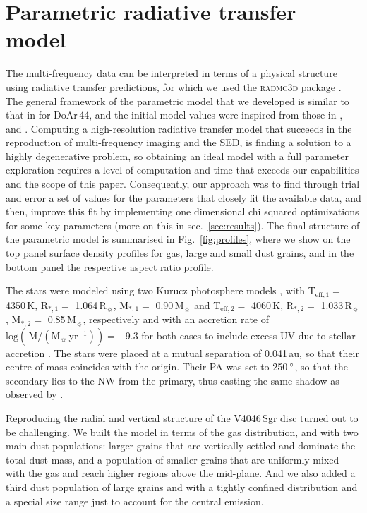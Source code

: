 \documentclass[fleqn,usenatbib,useAMS]{mnras}
\begin{document}
\section{Parametric radiative transfer model} \label{sec:model}

The multi-frequency data can be interpreted in terms of a physical structure using radiative transfer predictions, for which we used the \textsc{radmc3d} package \citep[version 2.0,][]{Dullemond_2012}. The general framework of the parametric model that we developed is similar to that in \citet{2018MNRAS.477.5104C} for DoAr\,44, and the initial model values were inspired from those in \citet{Rosenfeld_2013}, \citet{Ru_z_Rodr_guez_2019} and \citet{2019ApJ...882..160Q}. Computing a high-resolution radiative transfer model that succeeds in the reproduction of multi-frequency imaging and the SED, is finding a solution to a highly degenerative problem, so obtaining an ideal model with a full parameter exploration requires a level of computation and time that exceeds our capabilities and the scope of this paper. Consequently, our approach was to find through trial and error a set of values for the parameters that closely fit the available data, and then, improve this fit by implementing one dimensional chi squared optimizations for some key parameters (more on this in sec.~\ref{sec:results}). The final structure of the parametric model is summarised in Fig.~\ref{fig:profiles}, where we show on the top panel surface density profiles for gas, large and small dust grains, and in the bottom panel the respective aspect ratio profile.

The stars were modeled using two Kurucz photosphere models \citep{1979ApJS...40....1K, 1997A&A...318..841C}, with T$_{\mathrm{eff},1} =$ 4350\,K, R$_{*,1} =$ 1.064\,R$_{\sun}$, M$_{*,1} =$ 0.90\,M$_{\sun}$ and T$_{\mathrm{eff},2} =$ 4060\,K, R$_{*,2} =$ 1.033\,R$_{\sun}$, M$_{*,2} =$ 0.85\,M$_{\sun}$, respectively and with an accretion rate of $\mathrm{log}(\,\dot{\mathrm{M}}/(\mathrm{M}_{\sun}\,\mathrm{yr^{-1}})) = -$9.3 for both cases to include excess UV due to stellar accretion \citep{10.1111/j.1365-2966.2011.19366.x}. The stars were placed at a mutual separation of 0.041\,au, so that their centre of mass coincides with the origin. Their PA was set to 250\,$\hbox{$^\circ$}$, so that the secondary lies to the NW from the primary, thus casting the same shadow as observed by \citet{dOrazi}.

Reproducing the radial and vertical structure of the V4046\,Sgr disc turned out to be challenging. We built the model in terms of the gas distribution, and with two main dust populations: larger grains that are vertically settled and dominate the total dust mass, and a population of smaller grains that are uniformly mixed with the gas and reach higher regions above the mid-plane. And we also added a third dust population of large grains and with a tightly confined distribution and a special size range just to account for the central emission.
\end{document}
